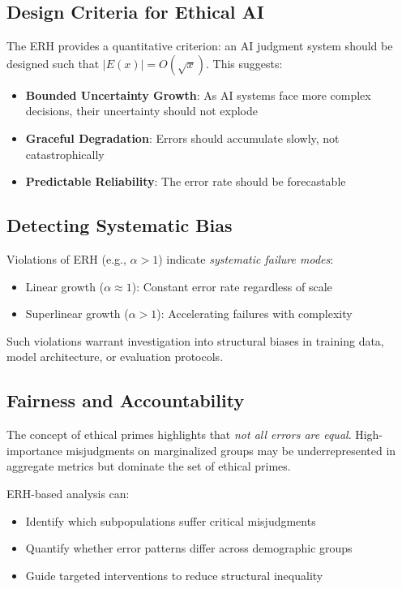 \documentclass[12pt,a4paper]{article}
\theoremstyle{definition}
\theoremstyle{remark}
\begin{document}
\subsection{Design Criteria for Ethical AI}

The ERH provides a quantitative criterion: an AI judgment system should be designed such that $|E(x)| = O(\sqrt{x})$. This suggests:

\begin{itemize}
    \item \textbf{Bounded Uncertainty Growth}: As AI systems face more complex decisions, their uncertainty should not explode
    \item \textbf{Graceful Degradation}: Errors should accumulate slowly, not catastrophically
    \item \textbf{Predictable Reliability}: The error rate should be forecastable
\end{itemize}

\subsection{Detecting Systematic Bias}

Violations of ERH (e.g., $\alpha > 1$) indicate \emph{systematic failure modes}:
\begin{itemize}
    \item Linear growth ($\alpha \approx 1$): Constant error rate regardless of scale
    \item Superlinear growth ($\alpha > 1$): Accelerating failures with complexity
\end{itemize}

Such violations warrant investigation into structural biases in training data, model architecture, or evaluation protocols.

\subsection{Fairness and Accountability}

The concept of ethical primes highlights that \emph{not all errors are equal}. High-importance misjudgments on marginalized groups may be underrepresented in aggregate metrics but dominate the set of ethical primes.

ERH-based analysis can:
\begin{itemize}
    \item Identify which subpopulations suffer critical misjudgments
    \item Quantify whether error patterns differ across demographic groups
    \item Guide targeted interventions to reduce structural inequality
\end{itemize}
\end{document}
